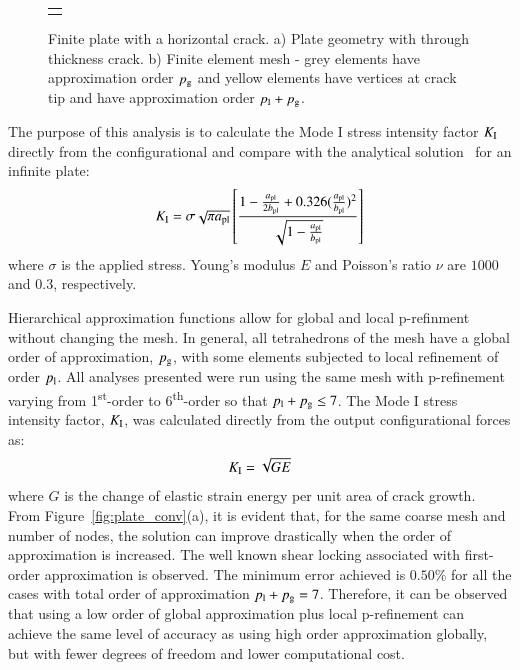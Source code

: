 \documentclass[review]{elsarticle}
\numberwithin{equation}{section}
\begin{document}
\begin{figure}[h!]
\begin{center}
\begin{tabular}{c}
{\def\svgwidth{15cm} }\\
\end{tabular}
\caption{Finite plate with a horizontal crack. a) Plate geometry with through thickness crack. b) Finite element mesh - grey elements have approximation order $p_{\rm g}$ and yellow elements have vertices at crack tip and have approximation order $p_{\rm l}+p_{\rm g}$. }
\label{fig:plate_load_mesh}
\end{center}
\end{figure}

The purpose of this analysis is to calculate the Mode I stress intensity factor $ K_{\rm I} $ directly from the configurational and compare with the analytical solution~\citep{rooke1976compendium} for an infinite plate:
\begin{equation}\label{eq:frac_analytical}
K_{\rm I}=\sigma \sqrt{\pi a_{\rm {pl}}} \left[  \frac{1 - \frac{a_{\rm {pl}}}{2b_{\rm {pl}}} + 0.326 (\frac{a_{\rm {pl}}}{b_{\rm {pl}}})^2 }{\sqrt{1-\frac{a_{\rm {pl}}}{b_{\rm {pl}}}}}  \right]
\end{equation}
where $\sigma $ is the applied stress. 
Young's modulus $E$ and Poisson's ratio $\nu$ are $1000$ and $0.3$, respectively. 


Hierarchical approximation functions allow for global and local p-refinment without changing the mesh.
In general, all tetrahedrons of the mesh have a global order of approximation, $p_{\rm g}$, with some elements subjected to local refinement of order $p_{\rm{l}}$.
All analyses presented were run using the same mesh with p-refinement varying from 1\textsuperscript{st}-order  to 6\textsuperscript{th}-order so that $p_{\rm l} + p_{\rm g} \leq 7$.
The Mode I stress intensity factor, $K_{\rm I}$, was calculated directly from the output configurational forces as: 
\begin{equation}
K_{\rm I} = \sqrt{GE}
\end{equation}
where $G$ is the change of elastic strain energy per unit area of crack growth.
From Figure~\ref{fig:plate_conv}(a), it is evident that, for the same coarse mesh and number of nodes, the solution can improve drastically when the order of approximation is increased. 
The well known shear locking associated with first-order approximation is observed. 
The minimum error achieved is $0.50\%$ for all the cases with total order of approximation  $p_{\rm l} + p_{\rm g} = 7$. 
Therefore, it can be observed that using a low order of global approximation plus local p-refinement 
can achieve the same level of accuracy as using high order approximation globally, but with fewer degrees of freedom and lower computational cost.
\end{document}

